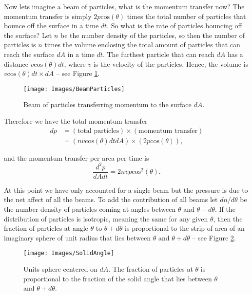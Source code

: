 \documentclass{article}
\begin{document}
Now lets imagine a beam of particles, what is the momentum transfer now? The momentum transfer is simply $2 p\mathrm{cos}(\theta)$ times the total number of particles that bounce off the surface in a time $dt$. So what is the rate of particles bouncing off the surface? Let $n$ be the number density of the particles, so then the number of particles is $n$ times the volume enclosing the total amount of particles that can reach the surface $dA$ in a time $dt$. The furthest particle that can reach $dA$ has a distance $v \mathrm{cos}(\theta) dt$, where $v$ is the velocity of the particles. Hence, the volume is $v\mathrm{cos}(\theta) dt\times dA$ -- see Figure \ref{Fig: Beam}.
\begin{figure}[h!]
\begin{center}
\texttt{[image: Images/BeamParticles]}
\end{center}
\caption{Beam of particles transferring momentum to the surface $dA$.}
\label{Fig: Beam}
\end{figure}
Therefore we have the total momentum transfer
\begin{equation*}
\begin{split}
dp & = (\mathrm{total\,\, particles})\times(\mathrm{momentum \,\, transfer}) \\
& = (n v\mathrm{cos}(\theta)dt dA)\times(2p \mathrm{cos}(\theta)),
\end{split}
\end{equation*}

\noindent
and the momentum transfer per area per time is
\begin{equation*}
\frac{d^2 p}{dA dt} = 2 n v p \mathrm{cos}^2(\theta).
\end{equation*}

At this point we have only accounted for a single beam but the pressure is due to the net affect of all the beams. To add the contribution of all beams let $dn/d\theta$ be the number density of particles coming at angles between $\theta$ and $\theta + d\theta$. If the distribution of particles is isotropic, meaning the same for any given $\theta$, then the fraction of particles at angle $\theta$ to $\theta +d\theta$ is proportional to the strip of area of an imaginary sphere of unit radius that lies between $\theta$ and $\theta + d\theta$ -- see Figure \ref{Fig: Solid Angle}. 

\begin{figure}[h!]
\begin{center}
\texttt{[image: Images/SolidAngle]}
\end{center}
\caption{Units sphere centered on $dA$. The fraction of particles at $\theta$ is proportional to the fraction of the solid angle that lies between $\theta$ and $\theta + d\theta$.}
\label{Fig: Solid Angle}
\end{figure}
\end{document}
